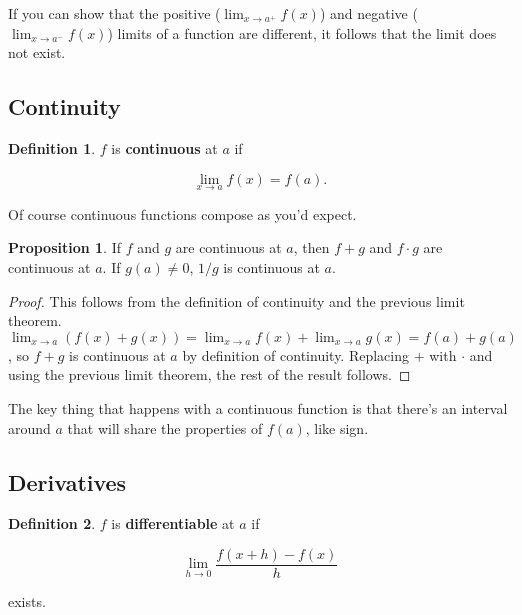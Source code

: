 \documentclass{article}
\theoremstyle{definition}
\newtheorem{definition}{Definition}[section]
\newtheorem{proposition}{Proposition}[section]
\begin{document}
If you can show that the positive ($\lim_{x \to a^{+}} f(x)$) and negative
($\lim_{x \to a^{-}} f(x) $) limits of a function are
different, it follows that the limit does not exist.


\subsection{Continuity}

\begin{definition}

$f$ is \textbf{continuous} at $a$ if

\begin{equation}
\lim_{x \to a} f(x) = f(a).
\end{equation}

\end{definition}

Of course continuous functions compose as you'd expect.

\begin{proposition}

If $f$ and $g$ are continuous at $a$, then $f+g$ and $f \cdot g$ are continuous
at $a$. If $g(a) \neq 0$, $1/g$ is continuous at $a$.

\end{proposition}

\begin{proof}

This follows from the definition of continuity and the previous limit
theorem. $\lim_{x \to a} (f(x) + g(x)) = \lim_{x \to a} f(x) + \lim_{x \to a}
g(x) = f(a) + g(a)$, so $f + g$ is continuous at $a$ by definition of
continuity. Replacing $+$ with $\cdot$ and using the previous limit theorem, the
rest of the result follows.

\end{proof}

The key thing that happens with a continuous function is that there's an
interval around $a$ that will share the properties of $f(a)$, like sign.

\subsection{Derivatives}

\begin{definition} 
$f$ is \textbf{differentiable} at $a$ if

\begin{equation}
\lim_{h \to 0} \frac{f(x+h) - f(x)}{h}
\end{equation}

exists.
\end{definition}
\end{document}

